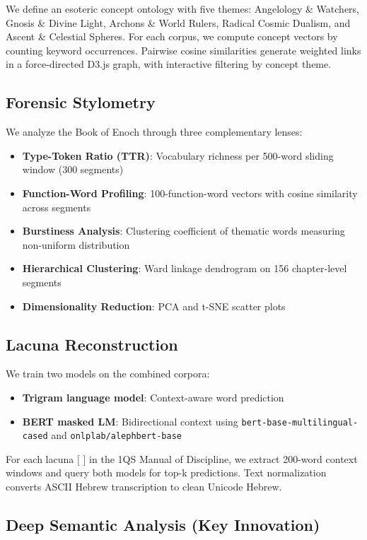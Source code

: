 \documentclass[11pt]{article}
\begin{document}
We define an esoteric concept ontology with five themes: Angelology \& Watchers, Gnosis \& Divine Light, Archons \& World Rulers, Radical Cosmic Dualism, and Ascent \& Celestial Spheres. For each corpus, we compute concept vectors by counting keyword occurrences. Pairwise cosine similarities generate weighted links in a force-directed D3.js graph, with interactive filtering by concept theme.

\subsection{Forensic Stylometry}

We analyze the Book of Enoch through three complementary lenses:
\begin{itemize}
    \item \textbf{Type-Token Ratio (TTR)}: Vocabulary richness per 500-word sliding window (300 segments)
    \item \textbf{Function-Word Profiling}: 100-function-word vectors with cosine similarity across segments
    \item \textbf{Burstiness Analysis}: Clustering coefficient of thematic words measuring non-uniform distribution
    \item \textbf{Hierarchical Clustering}: Ward linkage dendrogram on 156 chapter-level segments
    \item \textbf{Dimensionality Reduction}: PCA and t-SNE scatter plots
\end{itemize}

\subsection{Lacuna Reconstruction}

We train two models on the combined corpora:
\begin{itemize}
    \item \textbf{Trigram language model}: Context-aware word prediction
    \item \textbf{BERT masked LM}: Bidirectional context using \texttt{bert-base-multilingual-cased} and \texttt{onlplab/alephbert-base}
\end{itemize}

For each lacuna $[$ $]$ in the 1QS Manual of Discipline, we extract 200-word context windows and query both models for top-k predictions. Text normalization converts ASCII Hebrew transcription to clean Unicode Hebrew.

\subsection{Deep Semantic Analysis (Key Innovation)}
\end{document}
